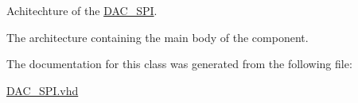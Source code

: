 Achitechture of the \hyperlink{classDAC__SPI}{D\-A\-C\-\_\-\-S\-P\-I}. 

The architecture containing the main body of the component. 

The documentation for this class was generated from the following file\-:\begin{DoxyCompactItemize}
\item 
\hyperlink{DAC__SPI_8vhd}{D\-A\-C\-\_\-\-S\-P\-I.\-vhd}\end{DoxyCompactItemize}
